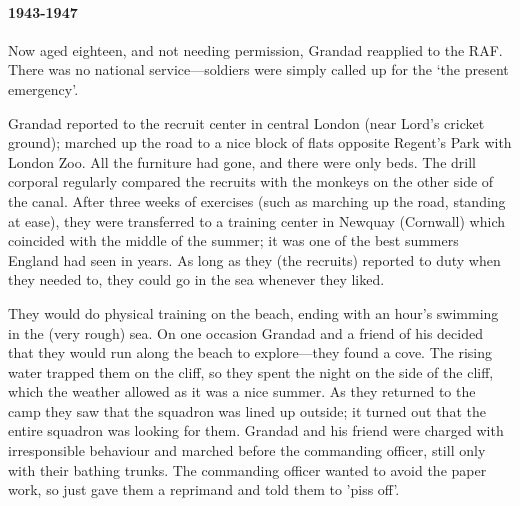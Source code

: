 \paragraph{1943-1947} Now aged eighteen, and not needing permission, Grandad reapplied to the RAF.
There was no national service---soldiers were simply called up for the `the present
emergency'.
\begin{figure}
	\centering
\end{figure}
Grandad reported to the recruit center in central London (near Lord's cricket ground);
marched up the road to a nice block of flats opposite Regent's Park with London Zoo.
All the furniture had gone, and there were only beds.
The drill corporal regularly compared the recruits with the monkeys on the other side of the canal.
After three weeks of exercises (such as marching up the road, standing at ease), they were transferred to a training
center in Newquay (Cornwall) which coincided with the middle of the summer; it was
one of the best summers England had seen in years. As long as they (the recruits) reported to duty when they needed to,
they could go in the sea whenever they liked.

They would do physical training on the beach, ending with an hour's swimming in the (very rough) sea.
On one occasion Grandad and a friend of his decided that they would run along the beach to explore---they found a
cove. The rising water trapped them on the cliff,  so they spent the night on the side of the cliff, which the
weather allowed as it was a nice summer.  As they returned to the camp they saw that the squadron was lined up outside;
it turned out that the entire squadron was looking for them. Grandad and his friend
were charged with irresponsible behaviour and marched before the commanding officer, still
only with their bathing trunks. The commanding officer wanted to avoid the paper work, so just
gave them a reprimand and told them to 'piss off'.

